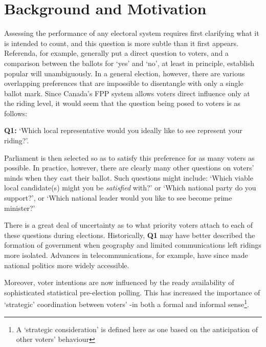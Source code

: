\documentclass[DIV=calc, paper=a4, fontsize=11pt, twocolumn]{scrartcl}	 %
\begin{document}
\section{Background and Motivation}
\label{sec:BM} 

Assessing the performance of any electoral system requires first clarifying what it is intended to count, and this question is more subtle than it first appears. 
Referenda, for example, generally put a direct question to voters, and a comparison between the ballots for `yes' and `no', at least in principle, establish popular will unambiguously. 
In a general election, however, there are various overlapping preferences that are impossible to disentangle with only a single ballot mark.
Since Canada's FPP system allows voters direct influence only at the riding level, it would seem that the question being posed to voters is as follows:

\begin{tcolorbox}[colback=white!5!white,colframe=blue!55!black]
{\textbf{Q1:} } `Which local representative would you ideally like to see represent your riding?'. 
\end{tcolorbox}

Parliament is then selected so as to satisfy this preference for as many voters as possible. 
In practice, however, there are clearly many other questions on voters' minds when they cast their ballot. 
Such questions might include: `Which viable local candidate(s) might you be \emph{satisfied} with?'  or `Which national party do you support?', or `Which national leader would you like to see become prime minister?' 

There is a great deal of uncertainty as to what priority voters attach to each of these questions during elections. Historically, \textbf{Q1} may have better described the formation of government when geography and limited communications left ridings more isolated.
Advances in telecommunications, for example, have since made national politics more widely accessible. 

Moreover, voter intentions are now influenced by the ready availability of sophisticated statistical pre-election polling. This has increased the importance of `strategic' coordination  between voters' \--in both a formal\cite{Leadnow_environics} and informal sense\footnote{A `strategic  consideration' is defined here as one based on the anticipation of other voters' behaviour}. 
\end{document}
